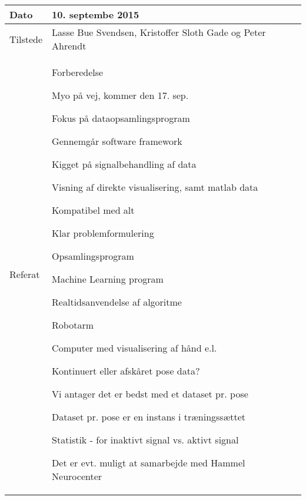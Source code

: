 \begin{center}
	\begin{tabular}{| l | p{10cm} |}
		\hline
		Dato		& 10. septembe 2015\\ \hline
		Tilstede 	& Lasse Bue Svendsen, Kristoffer Sloth Gade og Peter Ahrendt\\ \hline
		Referat		& \vspace{-5mm}\begin{myEnumerate}
			\item Forberedelse
			\begin{myItemize}				
				\item Myo på vej, kommer den 17. sep.
				\item Fokus på dataopsamlingsprogram
				\begin{myItemize}
					\item Gennemgår software framework
					\item Kigget på signalbehandling af data
					\item Visning af direkte visualisering, samt matlab data
				\end{myItemize}
				\begin{myItemize}
					\item Kompatibel med alt
				\end{myItemize}
			\end{myItemize}
			\item Klar problemformulering
			\begin{myItemize}
				\item Opsamlingsprogram
				\item Machine Learning program
				\item Realtidsanvendelse af algoritme
				\begin{myItemize}
					\item Robotarm
					\item Computer med visualisering af hånd  e.l.
				\end{myItemize}
			\end{myItemize}
			\item Kontinuert eller afskåret pose data?
			\begin{myItemize}
				\item Vi antager det er bedst med et dataset pr. pose
				\item Dataset pr. pose er en instans i træningssættet
				\item Statistik - for inaktivt signal vs. aktivt signal
			\end{myItemize}
			\item Det er evt. muligt at samarbejde med Hammel Neurocenter
		\end{myEnumerate}\\ 	
		\hline
	\end{tabular}
\end{center}

